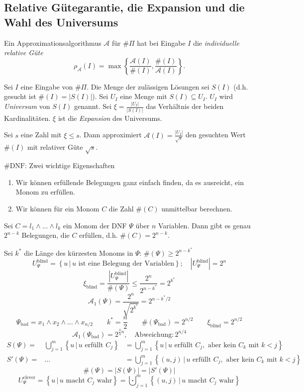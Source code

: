 \subsection{Relative Gütegarantie, die Expansion und die Wahl des Universums}
Ein Approximationsalgorithmus $\mathcal{A}$ für $\#\Pi$ hat bei Eingabe $I$ die
\textit{individuelle relative Güte}
\[
  \rho_\mathcal{A}(I) = \max\left\{ \frac{\mathcal{A}(I)}{\#(I)},
  \frac{\#(I)}{\mathcal{A}(I)} \right\}.
\]
\begin{defn}
	Sei $I$ eine Eingabe von $\#\Pi$. Die Menge der zulässigen Lösungen sei
	$S(I)$ (d.h. gesucht ist $\#(I) = |S(I)|$). Sei $U_I$ eine Menge mit
	$S(I) \subseteq U_I$. $U_I$ wird \textit{Universum} von $S(I)$ genannt.
	Sei $\xi = \frac{|U_I|}{|S(I)|}$ das Verhältnis der beiden
	Kardinalitäten. $\xi$ ist die \textit{Expansion} des Universums.
\end{defn}
\begin{satz}
	Sei $s$ eine Zahl mit $\xi \leq s$. Dann approximiert $\mathcal{A}(I) =
	\frac{|U_I|}{\sqrt{s}}$ den gesuchten Wert $\#(I)$ mit relativer Güte
	$\sqrt{s}$.
\end{satz}
$\#\text{DNF}$: Zwei wichtige Eigenschaften
\begin{enumerate}[(1)]
	\item Wir können erfüllende Belegungen ganz einfach finden, da es
		ausreicht, ein Monom zu erfüllen.
	\item Wir können für ein Monom $C$ die Zahl $\#(C)$ unmittelbar
		berechnen.
\end{enumerate}
\begin{lemm}
	Sei $C = l_1 \wedge \dots \wedge l_k$ ein Monom der DNF $\Psi$ über $n$
	Variablen.
	Dann gibt es genau $2^{n-k}$ Belegungen, die $C$ erfüllen, d.h. $\#(C) =
	2^{n-k}$.
\end{lemm}
Sei $k^*$ die Länge des kürzesten Monoms in $\Psi$: $\#(\Psi) \geq 2^{n-k^*}$
\[
  U_\Psi^{\text{blind}} = \left\{ u\,|\,u \text{ ist eine Belegung der
Variablen} \right\}; \quad \left|U_\Psi^{\text{blind}}\right| = 2^n \]
\[
  \xi_{\text{blind}} = \frac{\left|U_\Psi^{\text{blind}}\right|}{\#(\Psi)} \leq
  \frac{2^n}{2^{n-k^*}} = 2^{k^*}
\]
\[
  \mathcal{A}_1(\Psi) = \frac{2^n}{\sqrt{2^{k^*}}} = 2^{n-k^*/2}
\]
\[
  \Psi_{\text{bad}} = x_1 \wedge x_2 \wedge \dots \wedge x_{n/2} \quad \quad
  k^* = \frac{n}{2} \quad \quad \#(\Psi_{\text{bad}}) = 2^{n/2} \quad \quad
  \xi_{\text{blind}} = 2^{n/2}
\]
\[
  \mathcal{A}_1(\Psi_{\text{bad}}) = 2^{\frac{3}{4}n}, \quad \text{Abweichung:
}\,2^{n/4}
\]
\begin{eqnarray*}
	S(\Psi) = & \bigcup_{j=1}^{m} \left\{ u\,|\,u \text{ erfüllt } C_j
	\right\} & = \bigcup_{j=1}^{m} \left\{ u\,|\,u \text{ erfüllt } C_j,
	\text{ aber kein } C_k \text{ mit } k < j \right\} \\
	S'(\Psi) = & \dots & = \bigcup_{j=1}^{m} \left\{ (u, j)\,|\,u \text{ erfüllt } C_j,
	\text{ aber kein } C_k \text{ mit } k < j \right\}
\end{eqnarray*}
\[ \#(\Psi) = |S(\Psi)| = |S'(\Psi)| \]
\[ U_{\Psi}^{\text{clever}} = \left\{ u\,|\,u \text{ macht } C_j \text{ wahr} \right\} =
\bigcupdot_{j=1}^{m} \left\{ (u, j)\,|\,u \text{ macht } C_j \text{ wahr} \right\} \]

